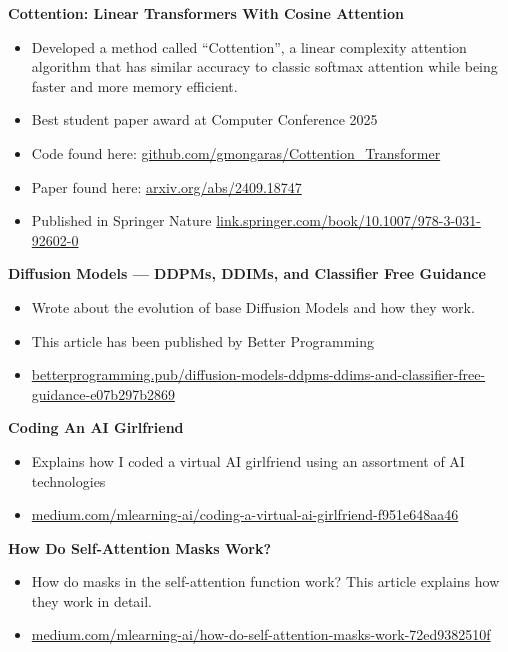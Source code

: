 \documentclass[a4paper,10pt]{article}
\begin{document}
\noindent\textbf{Cottention: Linear Transformers With Cosine Attention}
\begin{itemize}[noitemsep,topsep=0pt]
  \item Developed a method called “Cottention”, a linear complexity attention algorithm that has similar accuracy to classic softmax attention while being faster and more memory efficient.
  \item Best student paper award at Computer Conference 2025
  \item Code found here: \href{https://github.com/gmongaras/Cottention_Transformer}{github.com/gmongaras/Cottention\_Transformer}
  \item Paper found here: \href{https://arxiv.org/abs/2409.18747}{arxiv.org/abs/2409.18747}
  \item Published in Springer Nature \href{https://link.springer.com/book/10.1007/978-3-031-92602-0?sap-outbound-id=AD9F926E0AA16D13049BD2370EAFCAD37B0D3F1F}{link.springer.com/book/10.1007/978-3-031-92602-0}
\end{itemize}

\noindent\textbf{Diffusion Models — DDPMs, DDIMs, and Classifier Free Guidance}
\begin{itemize}[noitemsep,topsep=0pt]
  \item Wrote about the evolution of base Diffusion Models and how they work.
  \item This article has been published by Better Programming
  \item \href{https://betterprogramming.pub/diffusion-models-ddpms-ddims-and-classifier-free-guidance-e07b297b2869}{betterprogramming.pub/diffusion-models-ddpms-ddims-and-classifier-free-guidance-e07b297b2869}
\end{itemize}

\noindent\textbf{Coding An AI Girlfriend}
\begin{itemize}[noitemsep,topsep=0pt]
  \item Explains how I coded a virtual AI girlfriend using an assortment of AI technologies
  \item \href{https://medium.com/mlearning-ai/coding-a-virtual-ai-girlfriend-f951e648aa46}{medium.com/mlearning-ai/coding-a-virtual-ai-girlfriend-f951e648aa46}
\end{itemize}

\noindent\textbf{How Do Self-Attention Masks Work?}
\begin{itemize}[noitemsep,topsep=0pt]
  \item How do masks in the self-attention function work? This article explains how they work in detail.
  \item \href{https://medium.com/mlearning-ai/how-do-self-attention-masks-work-72ed9382510f}{medium.com/mlearning-ai/how-do-self-attention-masks-work-72ed9382510f}
\end{itemize}
\end{document}
